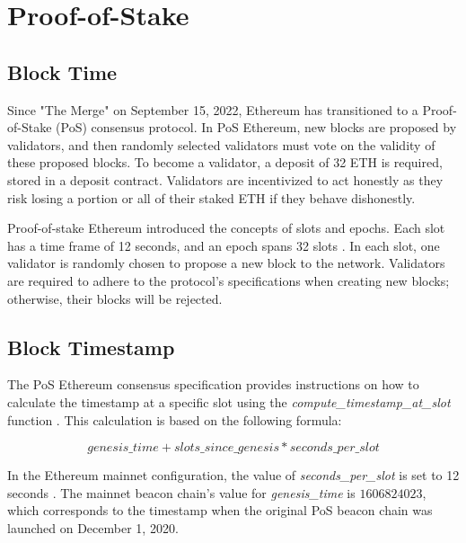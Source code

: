 

\section{Proof-of-Stake}

\subsection{Block Time}

Since "The Merge" on September 15, 2022, Ethereum has transitioned to a
Proof-of-Stake (PoS) consensus protocol. In PoS Ethereum, new blocks are
proposed by validators, and then randomly selected validators must vote on the
validity of these proposed blocks. To become a validator, a deposit of 32 ETH
is required, stored in a deposit contract. Validators are incentivized to act
honestly as they risk losing a portion or all of their staked ETH if they
behave dishonestly.

Proof-of-stake Ethereum introduced the concepts of slots and epochs. Each slot
has a time frame of 12 seconds, and an epoch spans 32 slots
\cite{seconds-per-slot-mainnet}\cite{seconds-per-slot-mainnet-doc}. In each
slot, one validator is randomly chosen to propose a new block to the network.
Validators are required to adhere to the protocol's specifications when
creating new blocks; otherwise, their blocks will be rejected.

\subsection{Block Timestamp}

The PoS Ethereum consensus specification provides instructions on how to
calculate the timestamp at a specific slot using the
\textit{compute\_timestamp\_at\_slot} function \cite{compute-timestamp-at-slot}.
This calculation is based on the following formula:

\begin{equation}
genesis\_time + slots\_since\_genesis *
seconds\_per\_slot
\end{equation}


In the Ethereum mainnet configuration, the value of \textit{seconds\_per\_slot} is set to
12 seconds \cite{seconds-per-slot-mainnet} \cite{seconds-per-slot-mainnet-doc}.
The mainnet beacon chain's value for \textit{genesis\_time} is $1606824023$, which
corresponds to the timestamp when the original PoS beacon chain was launched on
December 1, 2020.

